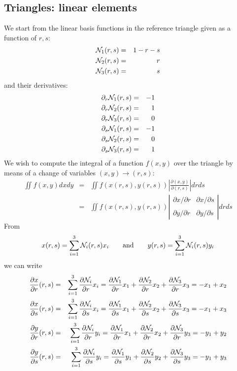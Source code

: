 \newpage
\subsection{Triangles: linear elements} \label{ss:tle}

We start from the linear basis functions in the reference triangle given as a function of $r,s$:
\begin{eqnarray}
{\mathcal{N}}_1(r,s) &=& 1-r-s \\
{\mathcal{N}}_2(r,s) &=& r \\
{\mathcal{N}}_3(r,s) &=& s
\end{eqnarray}
and their derivatives:
\begin{eqnarray}
\partial_r {\mathcal{N}}_1(r,s) &=& -1 \nonumber\\
\partial_r {\mathcal{N}}_2(r,s) &=& 1 \nonumber\\
\partial_r {\mathcal{N}}_3(r,s) &=& 0 \nonumber\\
\partial_s {\mathcal{N}}_1(r,s) &=& -1 \nonumber\\
\partial_s {\mathcal{N}}_2(r,s) &=& 0\nonumber\\
\partial_s {\mathcal{N}}_3(r,s) &=& 1\nonumber
\end{eqnarray}
We wish to compute the integral of a function $f(x,y)$ over the triangle by means of a change of variables
$(x,y)\rightarrow (r,s)$:
\begin{eqnarray}
\iint f(x,y) dx dy 
&=& \iint f(x(r,s),y(r,s)) \left| \frac{\partial (x,y)}{\partial (r,s) } \right|  dr ds \nonumber\\
&=& \iint f(x(r,s),y(r,s)) 
\left| 
\begin{array}{cc}
\partial x/\partial r & \partial x/\partial s \\ \\
\partial y/\partial r & \partial y/\partial s 
\end{array}
\right|  dr ds 
\end{eqnarray}
From 
\[
x(r,s)=\sum_{i=1}^3 {\mathcal{N}}_i(r,s) x_i 
\qquad \text{and} \qquad 
y(r,s)=\sum_{i=1}^3 {\mathcal{N}}_i(r,s) y_i 
\]
we can write
\begin{eqnarray}
\frac{\partial x}{\partial r}(r,s)
&=&\sum_{i=1}^3 \frac{\partial {\mathcal{N}}_i}{\partial r} x_i
=\frac{\partial {\mathcal{N}}_1}{\partial r} x_1+\frac{\partial {\mathcal{N}}_2}{\partial r} x_2+\frac{\partial {\mathcal{N}}_3}{\partial r} x_3
=- x_1+ x_2 \nonumber\\
\frac{\partial x}{\partial s}(r,s)
&=&\sum_{i=1}^3 \frac{\partial {\mathcal{N}}_i}{\partial s} x_i
=\frac{\partial {\mathcal{N}}_1}{\partial s} x_1+\frac{\partial {\mathcal{N}}_2}{\partial s} x_2+\frac{\partial {\mathcal{N}}_3}{\partial s} x_3
=- x_1+ x_3
\nonumber\\
\frac{\partial y}{\partial r}(r,s)
&=&\sum_{i=1}^3 \frac{\partial {\mathcal{N}}_i}{\partial r} y_i
=\frac{\partial {\mathcal{N}}_1}{\partial r} x_1+\frac{\partial {\mathcal{N}}_2}{\partial r} x_2+\frac{\partial {\mathcal{N}}_3}{\partial r} y_3
=- y_1+ y_2
\nonumber\\
\frac{\partial y}{\partial s}(r,s)
&=&\sum_{i=1}^3 \frac{\partial {\mathcal{N}}_i}{\partial s} y_i
=\frac{\partial {\mathcal{N}}_1}{\partial s} y_1+\frac{\partial {\mathcal{N}}_2}{\partial s} y_2+\frac{\partial {\mathcal{N}}_3}{\partial s} y_3
=- y_1+ y_3
\end{eqnarray}
